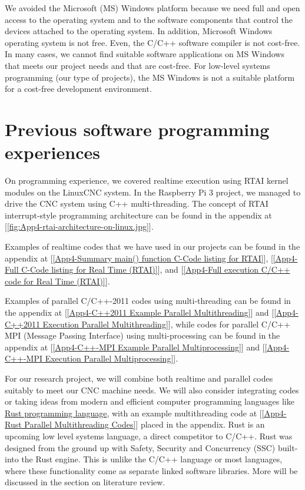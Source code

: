 We avoided the Microsoft (MS) Windows platform because we need full and open access to the operating system and to the software components that control the devices attached to the operating system. In addition, Microsoft Windows operating system is not free. Even, the C/C++ software compiler is not cost-free. In many cases, we cannot find suitable software applications on MS Windows that meets our project needs and that are cost-free. For low-level systems programming (our type of projects), the MS Windows is not a suitable platform for a cost-free development environment.  

\section{Previous software programming experiences}

On programming experience, we covered realtime execution using RTAI kernel modules on the LinuxCNC system. In the Raspberry Pi 3 project, we managed to drive the CNC system using C++ multi-threading. The concept of RTAI interrupt-style programming architecture can be found in the appendix at [\ref{fig:App4-rtai-architecture-on-linux.jpg}]. 
\vspace*{1\baselineskip}

Examples of realtime codes that we have used in our projects can be found in the appendix at [\ref{App4-Summary main() function C-Code listing for RTAI}], [\ref{App4-Full C-Code listing for Real Time (RTAI)}], and [\ref{App4-Full execution C/C++ code for Real Time (RTAI)}].  
\vspace*{1\baselineskip}

Examples of parallel C/C++-2011 codes using multi-threading can be found in the appendix at [\ref{App4-C++2011 Example Parallel Multithreading}] and [\ref{App4-C++2011 Execution Parallel Multithreading}], while codes for parallel C/C++ MPI (Message Passing Interface) using multi-processing can be found in the appendix at [\ref{App4-C++-MPI Example Parallel Multiprocessing}] and [\ref{App4-C++-MPI Execution Parallel Multiprocessing}]. 
\vspace*{1\baselineskip}

For our research project, we will combine both realtime and parallel codes suitably to meet our CNC machine needs. We will also consider integrating codes or taking ideas from modern and efficient computer programming languages like \href{https://www.rust-lang.org/}{Rust programming language}, with an example multithreading code at [\ref{App4-Rust Parallel Multithreading Codes}] placed in the appendix. Rust is an upcoming low level systems language, a direct competitor to C/C++. Rust was designed from the ground up with Safety, Security and Concurrency (SSC) built-into the Rust engine. This is unlike the C/C++ language or most languages, where these functionality come as separate linked software libraries. More will be discussed in the section on literature review.
\vspace*{1\baselineskip}

